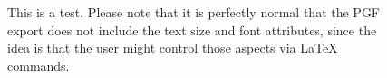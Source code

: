 \documentclass[a4paper, twoside]{article}
\begin{document}
\begin{figure}[h]
\centering
{
\small

}
\caption{This is a test. Please note that it is perfectly normal that the PGF export does not include the text size and font attributes, since the idea is that the user might control those aspects via LaTeX commands.}
\end{figure}
\end{document}
